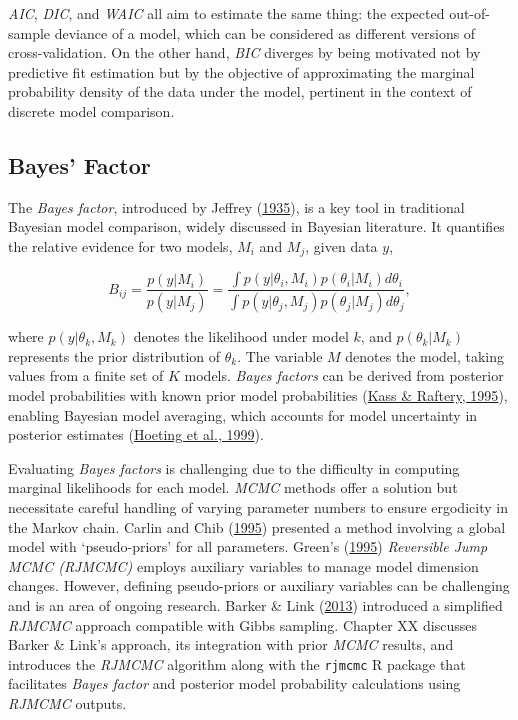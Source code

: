 \documentclass[
  11pt,
]{article}
\begin{document}
\emph{AIC}, \emph{DIC}, and \emph{WAIC} all aim to estimate the same
thing: the expected out-of-sample deviance of a model, which can be
considered as different versions of cross-validation. On the other hand,
\emph{BIC} diverges by being motivated not by predictive fit estimation
but by the objective of approximating the marginal probability density
of the data under the model, pertinent in the context of discrete model
comparison.

\subsection{Bayes’ Factor}

The \emph{Bayes factor}, introduced by Jeffrey
(\protect\hyperlink{ref-jeffreys1935}{1935}), is a key tool in
traditional Bayesian model comparison, widely discussed in Bayesian
literature. It quantifies the relative evidence for two models, \(M_i\)
and \(M_j\), given data \(y\),

\begin{equation}
B_{ij} = \frac{p(y|M_i)}{p(y|M_j)} = \frac{\int p(y|\theta_i,M_i)p(\theta_i|M_i)d\theta_i}{\int p(y|\theta_j,M_j)p(\theta_j|M_j)d\theta_j},
\end{equation}

where \(p(y|\theta_k,M_k)\) denotes the likelihood under model \(k\),
and \(p(\theta_k|M_k)\) represents the prior distribution of
\(\theta_k\). The variable \(M\) denotes the model, taking values from a
finite set of \(K\) models. \emph{Bayes factors} can be derived from
posterior model probabilities with known prior model probabilities
(\protect\hyperlink{ref-Kass1995}{Kass \& Raftery, 1995}), enabling
Bayesian model averaging, which accounts for model uncertainty in
posterior estimates (\protect\hyperlink{ref-Hoeting1999}{Hoeting et al.,
1999}).

Evaluating \emph{Bayes factors} is challenging due to the difficulty in
computing marginal likelihoods for each model. \emph{MCMC} methods offer
a solution but necessitate careful handling of varying parameter numbers
to ensure ergodicity in the Markov chain. Carlin and Chib
(\protect\hyperlink{ref-Carlin1995}{1995}) presented a method involving
a global model with `pseudo-priors' for all parameters. Green's
(\protect\hyperlink{ref-Green1995}{1995}) \emph{Reversible Jump MCMC
(RJMCMC)} employs auxiliary variables to manage model dimension changes.
However, defining pseudo-priors or auxiliary variables can be
challenging and is an area of ongoing research. Barker \& Link
(\protect\hyperlink{ref-Barker2013}{2013}) introduced a simplified
\emph{RJMCMC} approach compatible with Gibbs sampling. Chapter XX
discusses Barker \& Link's approach, its integration with prior
\emph{MCMC} results, and introduces the \emph{RJMCMC} algorithm along
with the \texttt{rjmcmc} R package that facilitates \emph{Bayes factor}
and posterior model probability calculations using \emph{RJMCMC}
outputs.
\end{document}
